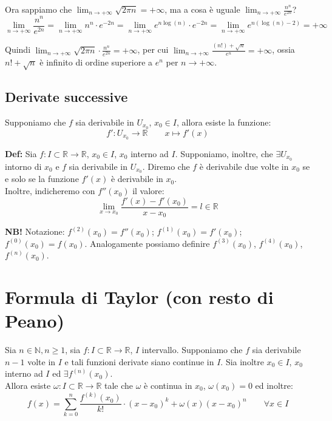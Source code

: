 \documentclass{article}
\begin{document}
\noindent Ora sappiamo che $\lim_{n \to +\infty} \sqrt{2\pi n} = +\infty$, ma a cosa è uguale $\lim_{n \to +\infty} \frac{n^n}{e^{2n}}$? 
\begin{equation*}
    \lim_{n \to +\infty} \frac{n^n}{e^{2n}} = \lim_{n \to +\infty} n^n \cdot e^{-2n} = \lim_{n \to +\infty} e^{n\log(n)} \cdot e^{-2n} = \lim_{n \to +\infty} e^{n(\log(n) - 2)} = +\infty
\end{equation*}

\noindent Quindi $\lim_{n \to +\infty} \sqrt{2\pi n} \cdot \frac{n^n}{e^{2n}} = +\infty$, per cui $\lim_{n \to +\infty} \frac{(n!) + \sqrt{n}}{e^n} = +\infty$, ossia $n! + \sqrt{n}$ è infinito di ordine superiore a $e^n$ per $n \to +\infty$.

\subsection{Derivate successive}
Supponiamo che $f$ sia derivabile in $U_{x_0}$, $x_0 \in I$, allora esiste la funzione:
\begin{equation*}
    f': U_{x_0} \xrightarrow{} \mathbb{R} \qquad x \longmapsto f'(x)
\end{equation*}

\noindent\textbf{Def:} Sia $f: I \subset \mathbb{R} \xrightarrow{} \mathbb{R}$, $x_0 \in I$, $x_0$ interno ad $I$. Supponiamo, inoltre, che $\exists U_{x_0}$ intorno di $x_0$ e $f$ sia derivabile in $U_{x_0}$. Diremo che $f$ è derivabile due volte in $x_0$ se e solo se la funzione $f'(x)$ è derivabile in $x_0$.\\
Inoltre, indicheremo con $f''(x_0)$ il valore:
\begin{equation*}
    \lim_{x \to x_0} \frac{f'(x) - f'(x_0)}{x - x_0} = l \in \mathbb{R}
\end{equation*}

\noindent\textbf{NB!} Notazione: $f^{(2)}(x_0) = f''(x_0)$; $f^{(1)}(x_0) = f'(x_0)$; $f^{(0)}(x_0) = f(x_0)$. Analogamente possiamo definire $f^{(3)}(x_0)$, $f^{(4)}(x_0)$, $f^{(n)}(x_0)$.

\section{Formula di Taylor (con resto di Peano)}
Sia $n \in \mathbb{N}, n \geq 1$, sia $f: I \subset \mathbb{R} \xrightarrow{} \mathbb{R}$, $I$ intervallo. Supponiamo che $f$ sia derivabile $n - 1$ volte in $I$ e tali funzioni derivate siano continue in $I$. Sia inoltre $x_0 \in I$, $x_0$ interno ad $I$ ed $\exists f^{(n)}(x_0)$.\\
Allora esiste $\omega: I \subset \mathbb{R} \xrightarrow{} \mathbb{R}$ tale che $\omega$ è continua in $x_0$, $\omega(x_0) = 0$ ed inoltre:
\begin{equation*}
    f(x) = \sum_{k = 0}^n \frac{f^{(k)}(x_0)}{k!} \cdot (x - x_0)^k + \omega(x)(x - x_0)^n \qquad \forall x \in I
\end{equation*}
\end{document}
